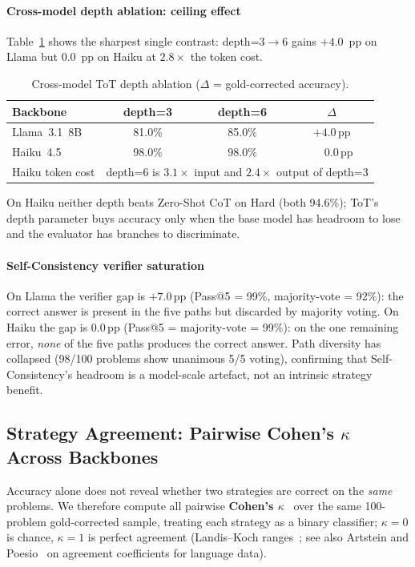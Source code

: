 \documentclass[conference]{IEEEtran}
\begin{document}
\paragraph{Cross-model depth ablation: ceiling effect}
Table~\ref{tab:crossmodel:depth} shows the sharpest single contrast:
depth=3$\rightarrow$6 gains $+4.0$~pp on Llama but $0.0$~pp on Haiku at
$2.8\times$ the token cost.
\begin{table}[t]
\centering
\caption{Cross-model ToT depth ablation ($\Delta$ = gold-corrected accuracy).}
\label{tab:crossmodel:depth}
\begin{tabular}{@{}lccc@{}}
\toprule
\textbf{Backbone} &
\textbf{depth=3} & \textbf{depth=6} & \boldmath$\Delta$ \\
\midrule
Llama~3.1~8B   & 81.0\% & 85.0\% & $+4.0$\,pp \\
Haiku~4.5      & 98.0\% & 98.0\% & $\phantom{+}0.0$\,pp \\
\midrule
Haiku token cost &
\multicolumn{3}{r}{depth=6 is $3.1\times$ input and $2.4\times$ output of depth=3} \\
\bottomrule
\end{tabular}
\end{table}
On Haiku neither depth beats Zero-Shot CoT on Hard (both 94.6\%);
ToT's depth parameter buys accuracy only when the base model has
headroom to lose and the evaluator has branches to discriminate.

\paragraph{Self-Consistency verifier saturation}
On Llama the verifier gap is $+7.0$\,pp (Pass@5 = 99\%,
majority-vote = 92\%): the correct answer is present in the five
paths but discarded by majority voting.
On Haiku the gap is $0.0$\,pp (Pass@5 = majority-vote = 99\%): on
the one remaining error, \emph{none} of the five paths produces the
correct answer.
Path diversity has collapsed (98/100 problems show unanimous 5/5
voting), confirming that Self-Consistency's headroom is a model-scale
artefact, not an intrinsic strategy benefit.

\subsection{Strategy Agreement: Pairwise Cohen's $\kappa$ Across Backbones}
\label{sec:results:kappa}

Accuracy alone does not reveal whether two strategies are correct on
the \emph{same} problems.
We therefore compute all pairwise \textbf{Cohen's $\kappa$}~\cite{cohen1960kappa}
over the same 100-problem gold-corrected sample, treating each strategy
as a binary classifier; $\kappa=0$ is chance, $\kappa=1$ is perfect
agreement (Landis--Koch ranges~\cite{landis1977kappa}; see also Artstein
and Poesio~\cite{artstein2008agreement} on agreement coefficients for
language data).
\end{document}
